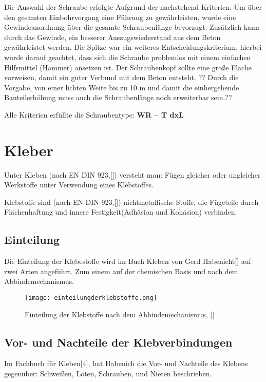 \documentclass[12 pt,a4 paper ]{scrreprt}
\begin{document}
Die Auswahl der Schraube erfolgte Aufgrund der nachstehend Kriterien.
Um über den gesamten Einbohrvorgang eine Führung zu gewährleisten, wurde eine Gewindeanordnung über die gesamte Schraubenlänge bevorzugt. Zusätzlich kann durch das Gewinde, ein besserer Auszugswiederstand aus dem Beton gewährleistet werden. 
Die Spitze war ein weiteres Entscheidungskriterium, hierbei wurde darauf geachtet, dass sich die Schraube problemlos mit einem einfachen Hilfsmittel (Hammer) ansetzen ist. 
Der Schraubenkopf sollte eine große Fläche vorweisen, damit ein guter  Verbund mit dem Beton entsteht. 
?? Durch die Vorgabe, von einer lichten Weite bis zu 10 m und damit die einhergehende Bauteilerhöhung muss auch die Schraubenlänge noch erweiterbar sein.??
\newline{}

Alle Kriterien erfüllte die Schraubentype: \textbf{WR – T dxL} 




\section{Kleber}
Unter Kleben (nach EN DIN 923,[]) versteht man: Fügen gleicher oder ungleicher Werkstoffe unter Verwendung eines Klebstoffes. 

Klebstoffe sind (nach EN DIN 923,[]) nichtmetallische Stoffe, die Fügeteile durch Flächenhaftung und innere Festigkeit(Adhäsion und Kohäsion) verbinden.


\subsection{Einteilung}

Die Einteilung der Klebestoffe wird im Buch Kleben von Gerd Habenicht[] auf zwei Arten angeführt. Zum einem auf der chemischen Basis und nach dem Abbindemechanismus. 
\begin{figure}[h]
\begin{center}
\texttt{[image: einteilungderklebstoffe.png]}
\caption{ Einteilung der Klebstoffe nach dem Abbindemechanismus, []}
\label{Einteilung der Kelbstoffe}
\end{center}
\end{figure}


\subsection{Vor- und Nachteile der Klebverbindungen}

Im Fachbuch für Kleben[4], hat Habenich die Vor- und Nachteile des Klebens gegenüber: Schweißen, Löten, Schrauben, und Nieten beschrieben. 
\newline{}
\end{document}
